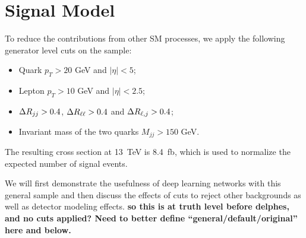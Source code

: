 \section{\label{sec:signal} Signal Model}
To reduce the contributions from other SM processes, we apply the
following generator level cuts on the \ssWW sample:
\begin{itemize}
\item Quark $p_T > 20$ GeV and $|\eta| < 5$;
\item Lepton $p_T > 10$ GeV and $|\eta| < 2.5$;
\item $ \Delta R _{jj}>0.4$, $ \Delta R _{\ell \ell}>0.4$ and $ \Delta R _{\ell, j} > 0.4$;
\item Invariant mass of the two quarks $M_{jj}> 150$ GeV.
\end{itemize}
The resulting cross section at 13~TeV is 8.4~fb, which is used to
normalize the expected number of signal events.

We will first demonstrate the usefulness of deep learning networks
with this general sample and then discuss the effects of cuts to
reject other backgrounds as well as detector modeling effects.  {\bf
  so this is at truth level before delphes, and no cuts applied?  Need
  to better define ``general/default/original'' here and below.}

